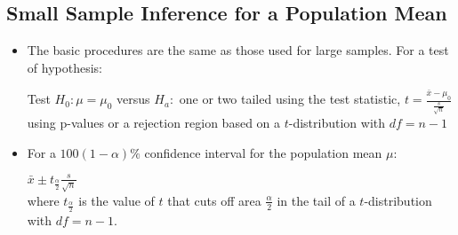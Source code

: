 \documentclass[12pt, letterpaper]{article}
\begin{document}
        \subsection{Small Sample Inference for a Population Mean}
            \begin{itemize}
                \item The basic procedures are the same as those used for large samples. For a test of hypothesis:
                \begin{mdframed}[leftmargin=0.5cm, rightmargin=0.5cm]
                    Test $H_0: \mu = \mu_0$ versus $H_a:$ one or two tailed using the test statistic,
                    $t = \frac{\bar{x}-\mu_0}{\frac{s}{\sqrt{n}}}$
                    using p-values or a rejection region based on a $t$-distribution with $df = n - 1$
                \end{mdframed}
                \newpage
                \item For a $100(1-\alpha)\%$ confidence interval for the population mean $\mu$:
                \begin{mdframed}[leftmargin=0.5cm, rightmargin=0.5cm]
                    $\bar{x} \pm t_{\frac{\alpha}{2}}\frac{s}{\sqrt{n}}$ \\
                    where $t_{\frac{\alpha}{2}}$ is the value of $t$ that cuts off area $\frac{\alpha}{2}$ in the tail of a $t$-distribution with $df = n - 1$.
                \end{mdframed}
            \end{itemize}
\end{document}

